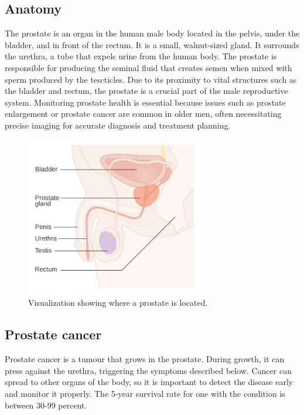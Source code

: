 \subsection{Anatomy}
The prostate is an organ in the human male body located in the pelvis, under the bladder, and in front of the rectum.  It is a small, walnut-sized gland. It surrounds the urethra, a tube that expels urine from the human body. The prostate is responsible for producing the seminal fluid that creates semen when mixed with sperm produced by the tescticles.
Due to its proximity to vital structures such as the bladder and rectum, the prostate is a crucial part of the male reproductive system. Monitoring prostate health is essential because issues such as prostate enlargement or prostate cancer are common in older men, often necessitating precise imaging for accurate diagnosis and treatment planning.
\begin{figure}[h]
\centering
\includegraphics[width=0.7\textwidth]{background/Diagram_showing_the_position_of_the_prostate_and_rectum_CRUK_358.svg.png}
\caption{Visualization showing where a prostate is located\cite{prostate-rectum-image}.}
\end{figure}

\newpage
\subsection{Prostate cancer}
Prostate cancer is a tumour that grows in the prostate. During growth, it can press against the urethra, triggering the symptoms described below.
Cancer can spread to other organs of the body, so it is important to detect the disease early and monitor it properly. 
The 5-year survival rate for one with the condition is between 30-99 percent.

